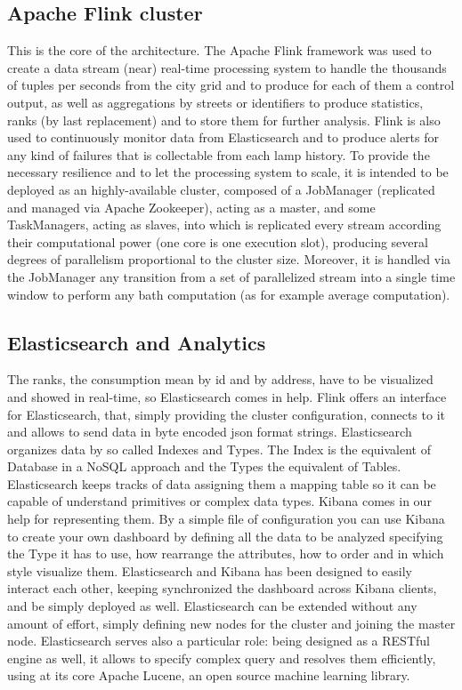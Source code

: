 \subsection{Apache Flink cluster}
This is the core of the architecture. The Apache Flink framework was used to create a data stream (near) real-time processing system to handle the thousands of tuples per seconds from the city grid and to produce for each of them a control output, as well as aggregations by streets or identifiers to produce statistics, ranks (by last replacement) and to store them for further analysis. Flink is also used to continuously monitor data from Elasticsearch and to produce alerts for any kind of failures that is collectable from each lamp history. To provide the necessary resilience and to let the processing system to scale, it is intended to be deployed as an highly-available cluster, composed of a JobManager (replicated and managed via Apache Zookeeper), acting as a master, and some TaskManagers, acting as slaves, into which is replicated every stream according their computational power (one core is one execution slot), producing several degrees of parallelism proportional to the cluster size. Moreover, it is handled via the JobManager any transition from a set of parallelized stream into a single time window to perform any bath computation (as for example average computation).

\subsection{Elasticsearch and Analytics}
The ranks, the consumption mean by id and by address, have to be visualized and showed in real-time, so Elasticsearch comes in help. Flink offers an interface for Elasticsearch, that, simply providing the cluster configuration, connects to it and allows to send data in byte encoded json format strings. Elasticsearch organizes data by so called Indexes and Types. The Index is the equivalent of Database in a NoSQL approach and the Types the equivalent of Tables. Elasticsearch keeps tracks of data assigning them a mapping table so it can be capable of understand primitives or complex data types. Kibana comes in our help for representing them. By a simple file of configuration you can use Kibana to create your own dashboard by defining all the data to be analyzed specifying the Type it has to use, how rearrange the attributes, how to order and in which style visualize them. Elasticsearch and Kibana has been designed to easily interact each other, keeping synchronized the dashboard across Kibana clients, and be simply deployed as well. Elasticsearch can be extended without any amount of effort, simply defining new nodes for the cluster and joining the master node. Elasticsearch serves also a particular role: being designed as a RESTful engine as well, it allows to specify complex query and resolves them efficiently, using at its core Apache Lucene, an open source machine learning library.


